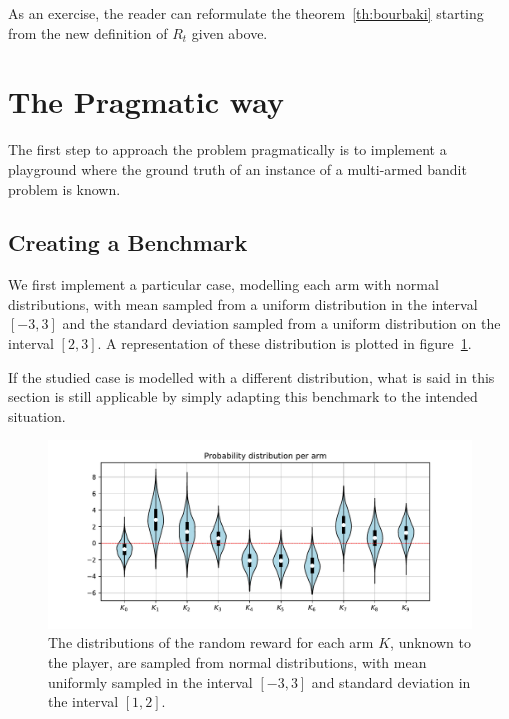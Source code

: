 \documentclass[]{scrartcl}
\theoremstyle{definition}
\begin{document}
\noindent
As an exercise, the reader can reformulate the theorem~\ref{th:bourbaki} starting from the new definition of $R_t$ given above.


\section{The Pragmatic way}
\label{se:pragmatic_perspective}

The first step to approach the problem pragmatically is to implement a playground where the ground truth of an instance of a multi-armed bandit problem is known. 

\subsection*{Creating a Benchmark}

We first implement a particular case, modelling each arm with normal distributions, with mean sampled from a uniform distribution in the interval $[-3, 3]$ and the standard deviation sampled from a uniform distribution on the interval $[2, 3]$. A representation of these distribution is plotted in
figure~\ref{fig:volin_plot}.

If the studied case is modelled with a different distribution, what is said in this section is still applicable by simply adapting this benchmark to the intended situation.

\begin{figure}[h]
    \hspace{-1.5cm}
    \includegraphics[width=18cm]{figures/initial_distributions.pdf}
    \caption{The distributions of the random reward for each arm $K$, unknown to the player, are sampled from normal distributions, with mean uniformly sampled in the interval $[-3, 3]$ and standard deviation in the interval $[1, 2]$.}
    \label{fig:volin_plot}
\end{figure}
\end{document}

